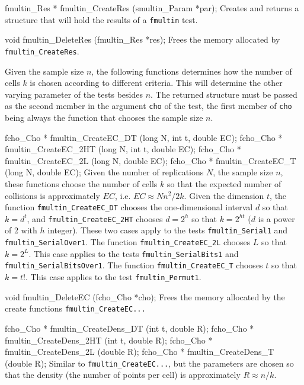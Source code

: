 fmultin_Res * fmultin_CreateRes (smultin_Param *par);
\endcode
 \tab
  Creates and returns a structure that will hold the results
  of a  {\tt fmultin} test.
 \endtab
\code


void fmultin_DeleteRes (fmultin_Res *res);
\endcode
 \tab
  Frees the memory allocated by {\tt fmultin\_CreateRes}.
 \endtab

\fi %


  Given the sample size $n$, the following functions determines
  how the number of cells $k$ is chosen according to different criteria.
  This will determine the other varying parameter of the tests besides $n$.
  The returned structure must be passed as the second member in the
  argument {\tt cho} of the test, the first member of {\tt cho} being always
  the function that chooses the sample size $n$.
\code


fcho_Cho * fmultin_CreateEC_DT (long N, int t, double EC);
fcho_Cho * fmultin_CreateEC_2HT (long N, int t, double EC);
fcho_Cho * fmultin_CreateEC_2L (long N, double EC);
fcho_Cho * fmultin_CreateEC_T (long N, double EC);
\endcode
 \tab
  Given the number of replications $N$, the sample size $n$, these
  functions choose the number of cells $k$ so that the expected
  number of collisions is approximately $EC$, i.e. $EC \approx Nn^2/2k$.
  Given the dimension $t$, the function {\tt fmultin\_CreateEC\_DT}
  chooses the one-dimensional interval $d$ so that $k= d^t$, and
  {\tt fmultin\_CreateEC\_2HT} chooses $d=2^h$
  so that $k= 2^{ht}$ ($d$ is a power of 2 with $h$ integer).
  These two cases apply to the tests {\tt fmultin\_Serial1} and
  {\tt fmultin\_SerialOver1}.
  The function {\tt fmultin\_CreateEC\_2L} chooses  $L$ so that $k= 2^L$.
  This case applies to the tests {\tt fmultin\_SerialBits1} and
  {\tt fmultin\_SerialBitsOver1}.
  The function {\tt fmultin\_CreateEC\_T} chooses  $t$ so that $k= t!$.
  This case applies to the test {\tt fmultin\_Permut1}.
 \endtab
\code


void fmultin_DeleteEC (fcho_Cho *cho);
\endcode
 \tab
  Frees the memory allocated by the create functions
 {\tt fmultin\_CreateEC...}
 \endtab
\code


fcho_Cho * fmultin_CreateDens_DT (int t, double R);
fcho_Cho * fmultin_CreateDens_2HT (int t, double R);
fcho_Cho * fmultin_CreateDens_2L (double R);
fcho_Cho * fmultin_CreateDens_T (double R);
\endcode
\tab  Similar to {\tt fmultin\_CreateEC...}, but the parameters are chosen
   so that the density (the number of points per cell) is approximately
   $R \approx n/k $.
\endtab
\code


